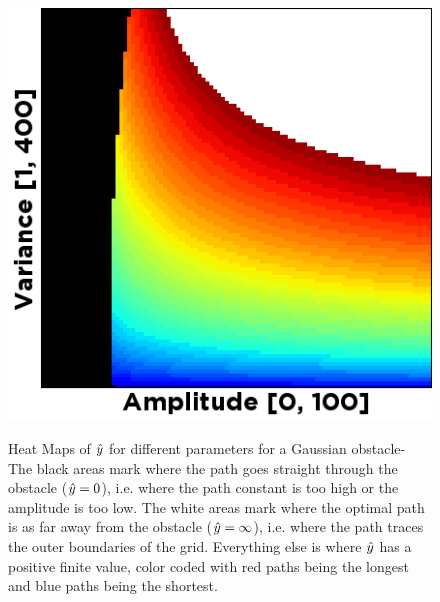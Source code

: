 \begin{figure}[t]
{\includegraphics[width=\szsz\columnwidth]{graphix/gav.png}
\label{fig:gav}}
\qquad
{}
\caption{Heat Maps of $\hat{y}$ for different parameters for a Gaussian obstacle- The black areas mark where the path goes straight through the obstacle ($\hat{y}=0$), i.e. where the path constant is too high or the amplitude is too low. The white areas mark where the optimal path is as far away from the obstacle ($\hat{y}=\infty$), i.e. where the path traces the outer boundaries of the grid. Everything else is where $\hat{y}$ has a positive finite value, color coded with red paths being the longest and blue paths being the shortest.}
\label{fig:colormaps}
\end{figure}

